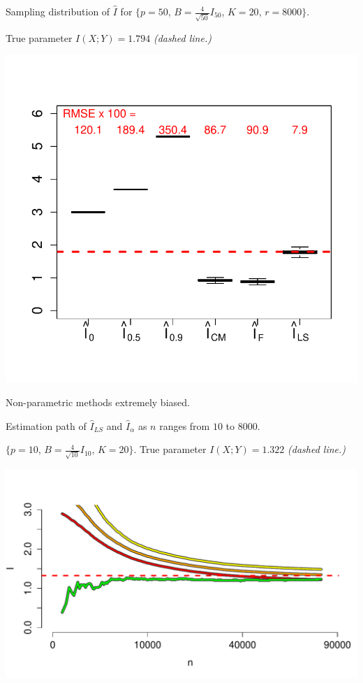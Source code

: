 \documentclass{article}
\begin{document}
Sampling distribution of $\hat{I}$ for \small{$\{p = 50$, $B = \frac{4}{\sqrt{50}} I_{50}$, $K = 20$, $r = 8000\}$.}

True parameter $I(X; Y) = 1.794$ \emph{(dashed line.)}
\begin{center}
\includegraphics[scale = 0.5, clip = true, trim = 0 0.5in 0 0.5in]{../info_theory_sims/fig2.pdf}
\end{center}
Non-parametric methods extremely biased.

Estimation path of $\hat{I}_{LS}$ and $\hat{I}_\alpha$ as $n$ ranges from $10$ to $8000$.

\small{$\{p = 10$, $B = \frac{4}{\sqrt{10}} I_{10}$, $K = 20\}$.
True parameter $I(X; Y) = 1.322$ \emph{(dashed line.)}}

\begin{center}
\includegraphics[scale = 0.4]{../info_theory_sims/fig3.pdf}
\end{center}
\end{document}
